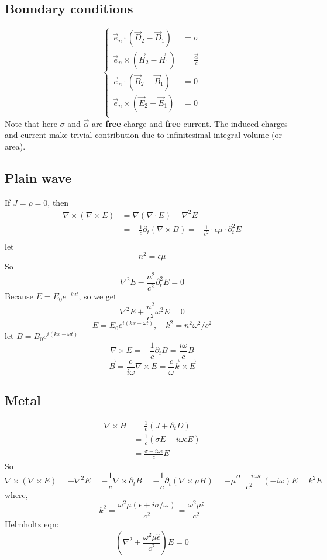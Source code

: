 \subsection{Boundary conditions}
\begin{equation}
    \left\{
	\begin{aligned}
	    \vec{e}_n \cdot (\vec{D}_2 - \vec{D}_1) &= \sigma    \\
	    \vec{e}_n \times (\vec{H}_2 - \vec{H}_1) &= \frac{\vec{\alpha}}{c}    \\
	    \vec{e}_n \cdot (\vec{B}_2 - \vec{B}_1) &= 0	\\
	    \vec{e}_n \times (\vec{E}_2 - \vec{E}_1) &= 0    \\
	\end{aligned}
	\right.
\end{equation}
Note that here $\sigma$ and $\vec{\alpha}$ are \textbf{free} charge and
\textbf{free} current. The induced charges and current make trivial
contribution due to infinitesimal integral volume (or area).
\subsection{Plain wave}
If $J = \rho = 0$, then
\[
    \begin{aligned}
    \nabla\times(\nabla\times{E}) &= \nabla(\nabla\cdot{E}) - \nabla^{2}E \\
	&=-\frac{1}{c}\partial_{t}(\nabla\times{B})
	=-\frac{1}{c^2}\cdot\epsilon\mu\cdot\partial^2_{t}E \\
    \end{aligned}
    \]
let 
\[ n^2=\epsilon\mu \]
So
\[
    \nabla^2{E}-\frac{n^2}{c^2}\partial^2_{t}E = 0 
    \]
Because $E = E_0e^{-i\omega{t}}$, so we get
\[
    \nabla^2{E}+\frac{n^2}{c^2}\omega^2E = 0 
    \]
\[
    E = E_0e^{i(kx-\omega{t})}, \quad k^2 = n^2\omega^2/c^2
    \]
let $B = B_0e^{i(kx-\omega{t})}$
\[
    \nabla\times{E} = -\frac{1}{c}\partial_{t}B = \frac{i\omega}{c}B
    \]
\[
    \vec{B}=\frac{c}{i\omega}\nabla\times{E}=\frac{c}{\omega}\vec{k}\times{\vec{E}}
    \]

\subsection{Metal}
\[
    \begin{aligned}
    \nabla\times{H}&=\frac{1}{c}(J+\partial_{t}D)   \\
    &=\frac{1}{c}(\sigma{E}-i\omega\epsilon{E})	\\
    &=\frac{\sigma-i\omega\epsilon}{c}E
    \end{aligned}
\]
So 
\[
    \nabla\times(\nabla\times{E})=-\nabla^2{E}=-\frac{1}{c}\nabla\times\partial_{t}B
    =-\frac{1}{c}\partial_{t}(\nabla\times{{\mu}H})
    =-\mu\frac{\sigma-i\omega\epsilon}{c^2}(-i\omega)E
    =k^2E
    \]
where,
\[
    k^2=\frac{\omega^2\mu(\epsilon+i\sigma/\omega)}{c^2}=\frac{\omega^2\mu\hat{\epsilon}}{c^2}
    \]
Helmholtz eqn:
\[
    (\nabla^2+\frac{\omega^2\mu\hat{\epsilon}}{c^2})E=0
    \]



